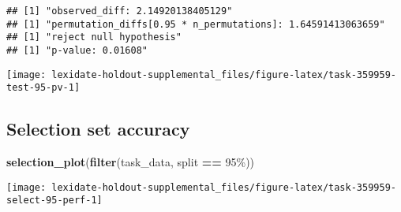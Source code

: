 \documentclass[
]{book}
\newenvironment{Shaded}{\begin{snugshade}}{\end{snugshade}}
\newcommand{\AttributeTok}[1]{\textcolor[rgb]{0.13,0.29,0.53}{#1}}
\newcommand{\DecValTok}[1]{\textcolor[rgb]{0.00,0.00,0.81}{#1}}
\newcommand{\FunctionTok}[1]{\textcolor[rgb]{0.13,0.29,0.53}{\textbf{#1}}}
\newcommand{\NormalTok}[1]{#1}
\newcommand{\OtherTok}[1]{\textcolor[rgb]{0.56,0.35,0.01}{#1}}
\newcommand{\SpecialCharTok}[1]{\textcolor[rgb]{0.81,0.36,0.00}{\textbf{#1}}}
\newcommand{\StringTok}[1]{\textcolor[rgb]{0.31,0.60,0.02}{#1}}
\begin{document}
\begin{Shaded}
\end{Shaded}

\begin{verbatim}
## [1] "observed_diff: 2.14920138405129"
## [1] "permutation_diffs[0.95 * n_permutations]: 1.64591413063659"
## [1] "reject null hypothesis"
## [1] "p-value: 0.01608"
\end{verbatim}

\texttt{[image: lexidate-holdout-supplemental\_files/figure-latex/task-359959-test-95-pv-1]}

\hypertarget{selection-set-accuracy-39}{%
\subsection{Selection set accuracy}\label{selection-set-accuracy-39}}

\begin{Shaded}
\begin{Highlighting}[]
\FunctionTok{selection\_plot}\NormalTok{(}\FunctionTok{filter}\NormalTok{(task\_data, split }\SpecialCharTok{==} \StringTok{\textquotesingle{}95\%\textquotesingle{}}\NormalTok{))}
\end{Highlighting}
\end{Shaded}

\texttt{[image: lexidate-holdout-supplemental\_files/figure-latex/task-359959-select-95-perf-1]}
\end{document}
